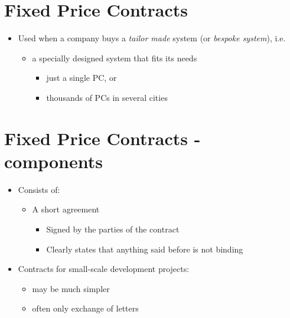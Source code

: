 \documentclass{article}
\begin{document}
\section{Fixed Price Contracts}
\begin{itemize}
\item Used when a company buys a \emph{tailor made} system (or \emph{bespoke system}), i.e.
\begin{itemize}
\item a specially designed system that fits its needs
\begin{itemize}
\item just a single PC, or
\item thousands of PCs in several cities
\end{itemize}
\end{itemize}
\end{itemize}



\section{Fixed Price Contracts - components}
\begin{itemize}
\item Consists of:
\begin{itemize}
\item A short agreement
\begin{itemize}
\item Signed by the parties of the contract
\item Clearly states that anything said before is not binding
\end{itemize}
\end{itemize}
\item Contracts for small-scale development projects:
\begin{itemize}
\item may be much simpler
\item often only exchange of letters
\end{itemize}
\end{itemize}
\end{document}
